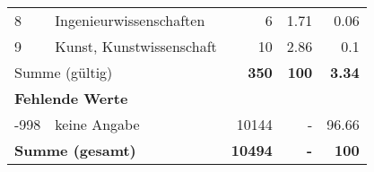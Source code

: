 \begin{longtable}{lXrrr}
     8 &
     \multicolumn{1}{X}{ Ingenieurwissenschaften   } &


       \num{6} &
       \num[round-mode=places,round-precision=2]{1,71} &
         \num[round-mode=places,round-precision=2]{0,06} \\

     9 &
     \multicolumn{1}{X}{ Kunst, Kunstwissenschaft   } &


       \num{10} &
       \num[round-mode=places,round-precision=2]{2,86} &
         \num[round-mode=places,round-precision=2]{0,1} \\
     \midrule
     \multicolumn{2}{l}{Summe (gültig)} &
       \textbf{\num{350}} &
     \textbf{100} &
       \textbf{\num[round-mode=places,round-precision=2]{3,34}} \\
     \multicolumn{5}{l}{\textbf{Fehlende Werte}}\\
       -998 &
       keine Angabe &
         \num{10144} &
        - &
         \num[round-mode=places,round-precision=2]{96,66} \\
     \midrule
     \multicolumn{2}{l}{\textbf{Summe (gesamt)}} &
          \textbf{\num{10494}} &
        \textbf{-} &
        \textbf{100} \\
     \bottomrule
     \end{longtable}
     
